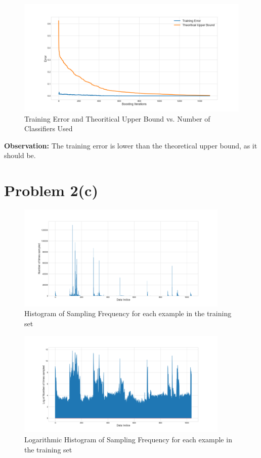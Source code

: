 \documentclass[openany,11pt]{homework}
\begin{document}
\begin{figure}[h]
	\centering
	\includegraphics[width = \textwidth]{Homework_3_export/2b.png}
	\caption{Training Error and Theoritical Upper Bound vs. Number of Classifiers Used}
\end{figure}

\textbf{Observation:} The training error is lower than the theoretical upper bound, as it should be.

\section*{Problem 2(c)}

\begin{figure}[!h]
	\centering
	\includegraphics[width = 0.9\textwidth]{Homework_3_export/2c.png}
	\caption{Histogram of Sampling Frequency for each example in the training set}
\end{figure}

\begin{figure}[!h]
	\centering
	\includegraphics[width = 0.9\textwidth]{Homework_3_export/2c_log.png}
	\caption{Logarithmic Histogram of Sampling Frequency for each example in the training set}
\end{figure}
\end{document}
